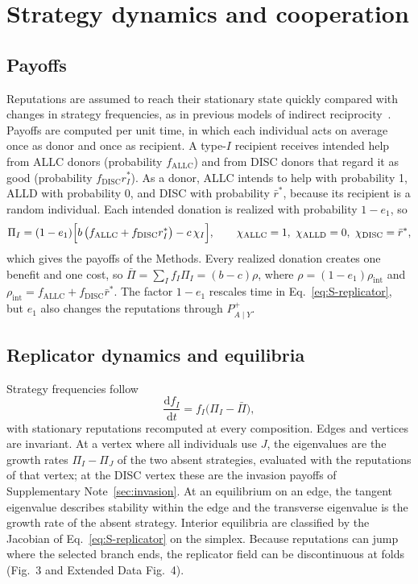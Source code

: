 \documentclass[fleqn,10pt]{article}
\theoremstyle{plain}
\theoremstyle{remark}
\newcommand{\FigStrategy}{3}
\newcommand{\EDEdge}{4}
\newcommand{\ALLC}{\mathrm{ALLC}}
\newcommand{\ALLD}{\mathrm{ALLD}}
\newcommand{\DISC}{\mathrm{DISC}}
\begin{document}
\section{Strategy dynamics and cooperation}
\label{sec:strategy}

\subsection{Payoffs}
Reputations are assumed to reach their stationary state quickly compared with
changes in strategy frequencies, as in previous models of indirect
reciprocity~\cite{radzvilavicius2019,kessinger2023,michelmata2024,radzvilavicius2021}.
Payoffs are computed per unit time, in which each individual acts on average
once as donor and once as recipient. A type-$I$ recipient receives intended
help from ALLC donors (probability $f_{\ALLC}$) and from DISC donors that regard
it as good (probability $f_{\DISC}r_I^*$). As a donor, ALLC intends to help with
probability 1, ALLD with probability 0, and DISC with probability $\bar r^*$,
because its recipient is a random individual. Each intended donation is
realized with probability $1-e_1$, so
\begin{equation}
\Pi_I=(1-e_1)\Bigl[b\,\bigl(f_{\ALLC}+f_{\DISC}r_I^*\bigr)-c\,\chi_I\Bigr],\qquad
\chi_{\ALLC}=1,\ \chi_{\ALLD}=0,\ \chi_{\DISC}=\bar r^*,
\label{eq:S-payoffs}
\end{equation}
which gives the payoffs of the Methods. Every realized donation creates one
benefit and one cost, so $\bar\Pi=\sum_If_I\Pi_I=(b-c)\rho$, where
$\rho=(1-e_1)\rho_{\mathrm{int}}$ and $\rho_{\mathrm{int}}=f_{\ALLC}+f_{\DISC}\bar r^*$.
The factor $1-e_1$ rescales time in Eq.~\eqref{eq:S-replicator}, but $e_1$ also
changes the reputations through $P^+_{A\mid Y}$.

\subsection{Replicator dynamics and equilibria}
Strategy frequencies follow
\begin{equation}
\frac{\mathrm df_I}{\mathrm dt}=f_I\bigl(\Pi_I-\bar\Pi\bigr),
\label{eq:S-replicator}
\end{equation}
with stationary reputations recomputed at every composition. Edges and
vertices are invariant. At a vertex where all individuals use $J$, the
eigenvalues are the growth rates $\Pi_I-\Pi_J$ of the two absent strategies,
evaluated with the reputations of that vertex; at the DISC vertex these are the
invasion payoffs of Supplementary Note~\ref{sec:invasion}. At an equilibrium on
an edge, the tangent eigenvalue describes stability within the edge and the
transverse eigenvalue is the growth rate of the absent strategy. Interior
equilibria are classified by the Jacobian of Eq.~\eqref{eq:S-replicator} on the
simplex. Because reputations can jump where the selected branch ends, the
replicator field can be discontinuous at folds (Fig.~\FigStrategy{} and
Extended Data Fig.~\EDEdge).
\end{document}
